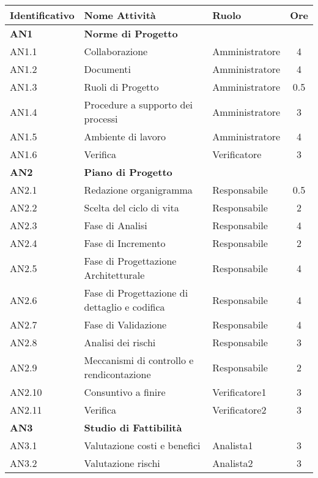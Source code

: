 \begin{longtable}{|l|l|l|c|}
  \hline
  \textbf{Identificativo} &
  \textbf{Nome Attività} &
  \textbf{Ruolo} &
  \textbf{Ore}\\
  \hline
  \textbf{AN1} & \textbf{Norme di Progetto} &  &  \\
  \hline
  	{AN1.1} & Collaborazione & Amministratore  & 4\\
  	\hline
  	{AN1.2} & Documenti & Amministratore & 4\\
  	\hline
  	{AN1.3} & {Ruoli di Progetto} & Amministratore &  0.5\\
  	\hline
  	{AN1.4} & {Procedure a supporto dei processi} & Amministratore  &  3\\
  	\hline
  	{AN1.5} & {Ambiente di lavoro} & Amministratore &  4\\
  	\hline
  	{AN1.6} & {Verifica} & Verificatore & 3 \\
  \hline
  \textbf{AN2} & \textbf{Piano di Progetto}  & & \\
    \hline
    	{AN2.1} & {Redazione organigramma} & Responsabile &  0.5\\
    	\hline
    	{AN2.2} & {Scelta del ciclo di vita} & Responsabile &  2\\
    	\hline
    	{AN2.3} & {Fase di Analisi} & Responsabile& 4 \\
    	\hline
    	{AN2.4} & {Fase di Incremento} & Responsabile& 2 \\
    	\hline
    	{AN2.5} & {Fase di Progettazione Architetturale} & Responsabile &   4\\
    	\hline
    	{AN2.6} & {Fase di Progettazione di dettaglio e codifica} & Responsabile  &  4\\
    	\hline
    	{AN2.7} & {Fase di Validazione} & Responsabile  &  4\\
    	\hline
    	{AN2.8} & {Analisi dei rischi} & Responsabile  &  3\\
    	\hline
    	{AN2.9} & {Meccanismi di controllo e rendicontazione} & Responsabile  & 2\\
    	\hline
    	{AN2.10} & {Consuntivo a finire} & Verificatore1  & 3\\
    	\hline
    	{AN2.11} & {Verifica} & Verificatore2  & 3 \\
    \hline
    \textbf{AN3} & \textbf{Studio di Fattibilità}  & &  \\
      \hline
      	{AN3.1} & {Valutazione costi e benefici} & Analista1  & 3 \\
      	\hline
      	{AN3.2} & {Valutazione rischi} & Analista2 & 3\\

\end{longtable}
